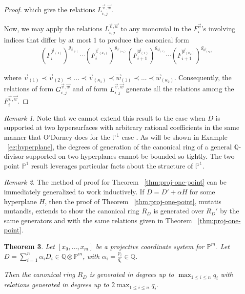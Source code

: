 \documentclass{amsart}
\theoremstyle{plain}
\newtheorem{thm}{Theorem}[section]
\theoremstyle{definition}
\theoremstyle{remark}
\newtheorem{rem}[thm]{Remark}
\numberwithin{equation}{section}
\newcommand\bq{{\mathbb Q}}
\newcommand\bp{{\mathbb P}}
\begin{document}
\begin{proof}
\noindent 
which give the relations $L_{i, j}^{\vec{v}, \vec{w}}$.

Now, we may apply the relations $L_{i, j}^{\vec{v}, \vec{w}}$
to any monomial in the $F_i^{\vec{v}}$'s involving
indices that differ by at most $1$ to produce the canonical form
\begin{align*}
	(F_i^{\vec{v}_{(1)}})^{g_{\vec{v}_{(1)}}} \cdots
	(F_i^{\vec{v}_{(\kappa_1)}})^{g_{\vec{v}_{(\kappa_1)}}}
	(F_{i + 1}^{\vec{w}_{(1)}})^{g_{\vec{w}_{(1)}}} \cdots
	(F_{i + 1}^{\vec{w}_{(\kappa_2)}})^{g_{\vec{w}_{(\kappa_2)}}}
\end{align*}

\noindent
where $\vec{v}_{(1)} \prec \vec{v}_{(2)} \prec \ldots \prec
\vec{v}_{(\kappa_1)} \prec \vec{w}_{(1)} \prec \ldots \prec
\vec{w}_{(\kappa_2)}$. Consequently, the relations of form
$G_{i, j}^{\vec{v}, \vec{w}}$ and of form $L_{i, j}^{\vec{v},
\vec{w}}$ generate all the relations among the $F_{i}^{\vec{v},
\vec{w}}$.
\end{proof}

\begin{rem}
\label{rem:proj-two-points}
Note that we cannot extend this result to the case when
$D$ is supported at two hypersurfaces with arbitrary rational
coefficients in the same manner that O'Dorney does for the
$\bp^1$ case \cite[Section 4]{dorney:canonical}. As will be shown
in Example ~\ref{eg:hyperplane}, the degrees of generation of the
canonical ring of a general $\bq$-divisor supported on two
hyperplanes cannot be bounded so tightly. The two-point
$\bp^1$ result leverages particular facts about the structure of
$\bp^1$. 
\end{rem}

\begin{rem}
\label{rem:proj-one-point-ind}
The method of proof for Theorem ~\ref{thm:proj-one-point}
can be immediately generalized to work inductively. If $D = D' + \alpha H$
for some hyperplane $H$, then the proof of Theorem ~\ref{thm:proj-one-point}, mutatis mutandis, extends to show
the canonical ring $R_D$ is generated over $R_D'$ by the same
generators and with the same relations given in Theorem
~\ref{thm:proj-one-point}.
\end{rem}
\begin{thm}
\label{thm:proj-effective}
Let $[x_0, \ldots, x_m]$ be a projective coordinate system for
$\bp^m$. Let $D = \sum_{i = 1}^{n} \alpha_i D_i \in \bq \otimes \bp^m$, with $\alpha_i =
\frac{p_i}{q_i} \in \bq$.

Then the canonical ring
$R_D$
is generated in degrees up to $\max_{1 \leq i \leq n}{q_i}$ with
relations generated in degrees up to $2 \max_{1 \leq i \leq n}{q_i}$.
\end{thm}
\end{document}
